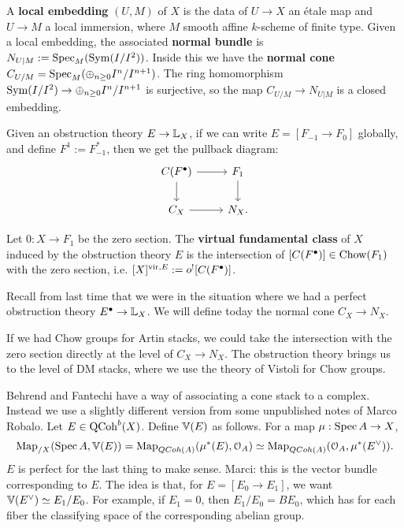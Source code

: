 \begin{defin}
A \textbf{local embedding} $(U,M)$ of $X$ is the data of $U\to X$ an \'etale map and $U\to M$ a local immersion, 
where $M$ smooth affine $k$-scheme of finite type.
Given a local embedding, the associated \textbf{normal bundle} is $N_{U|M} := \operatorname{Spec}_M(\operatorname{Sym} (I/I^2))$. Inside this 
we have the \textbf{normal cone} $C_{U/M} = \operatorname{Spec}_M(\oplus_{n\geq 0} I^n/I^{n+1})$.
The ring homomorphism $\operatorname{Sym} (I/I^2) \to \oplus_{n\geq 0} I^n/I^{n+1}$ is surjective, so the map
$C_{U/M}	\to N_{U|M}$ is a closed embedding.
\end{defin}

Given an obstruction theory $E \to \mathbb L_X$, if we can write $E = [F_{-1} \to F_0]$ globally, and define $F^1 := F_{-1}^*$, 
then we get the pullback diagram:
\[
\begin{tikzcd}
C(F^{\bullet})\arrow{r}\arrow{d} & F_1\arrow{d} \\ C_X \arrow{r} & N_X .
\end{tikzcd}
\]

\begin{defin}
Let $0: X \to F_1$ be the zero section.
The \textbf{virtual fundamental class} of $X$ induced by the obstruction theory $E$ is the intersection of
$[C(F^{\bullet})] \in \operatorname{Chow}(F_1)$ with the zero section, i.e. $[X]^{\operatorname{vir}, E} := o^{!}[C(F^{\bullet})]$.
\end{defin}





Recall from last time that we were in the situation where we had a perfect obstruction theory $E^{\bullet} \to \mathbb L_X$.
We will define today the normal cone $C_X \to N_X$. 

If we had Chow groups for Artin stacks, we could take the intersection with the zero section directly at the level 
of $C_X \to N_X$. The obstruction theory brings us to the level of DM stacks, where we use the theory of Vistoli for
Chow groups. 

Behrend and Fantechi have a way of associating a cone stack to a complex. Instead we use a slightly different version from
some unpublished notes of Marco Robalo. Let $E \in \mathrm{QCoh}^b(X)$. Define $\mathbb V(E)$ as follows. For a map $\mu:\operatorname{Spec} A \to X$,
\[	\operatorname{Map}_{/X}(\operatorname{Spec} A, \mathbb V(E)) = \operatorname{Map}_{QCoh(A)}(\mu^*(E), \mathcal{O}_A) \simeq \operatorname{Map}_{QCoh(A)}(\mathcal{O}_A,\mu^*(E^{\vee})).	\]
$E$ is perfect for the last thing to make sense. Marci: this is the vector bundle corresponding to $E$. The idea is that,
for $E = [E_0 \to E_1]$, we want $\mathbb V(E^{\vee}) \simeq E_1/E_0$. For example, if $E_1 = 0$, then $E_1/E_0 = BE_0$, which has for each
fiber the classifying space of the corresponding abelian group.

